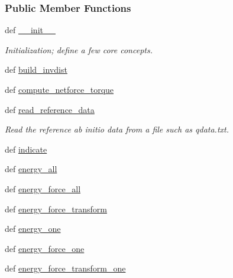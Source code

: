 \subsubsection*{Public Member Functions}
\begin{DoxyCompactItemize}
\item 
def \hyperlink{classforcebalance_1_1abinitio_1_1AbInitio_ad6d702694d6cd99e3432183e5c4860c9}{\-\_\-\-\_\-init\-\_\-\-\_\-}
\begin{DoxyCompactList}\small\item\em Initialization; define a few core concepts. \end{DoxyCompactList}\item 
def \hyperlink{classforcebalance_1_1abinitio_1_1AbInitio_a7475857193eefd4edd020d4f2a8fec17}{build\-\_\-invdist}
\item 
def \hyperlink{classforcebalance_1_1abinitio_1_1AbInitio_afbf86c26158a68cae7460b4106809fdd}{compute\-\_\-netforce\-\_\-torque}
\item 
def \hyperlink{classforcebalance_1_1abinitio_1_1AbInitio_aa73bedbf1e2cf19f2fa1e88815f1bd86}{read\-\_\-reference\-\_\-data}
\begin{DoxyCompactList}\small\item\em Read the reference ab initio data from a file such as qdata.\-txt. \end{DoxyCompactList}\item 
def \hyperlink{classforcebalance_1_1abinitio_1_1AbInitio_a3260db78e8c174f04a64661c4e5c181c}{indicate}
\item 
def \hyperlink{classforcebalance_1_1abinitio_1_1AbInitio_a99cca2d0bcbb382fcf7069907e74639f}{energy\-\_\-all}
\item 
def \hyperlink{classforcebalance_1_1abinitio_1_1AbInitio_acffb00d0edc291791eafb8a2d63ab3a1}{energy\-\_\-force\-\_\-all}
\item 
def \hyperlink{classforcebalance_1_1abinitio_1_1AbInitio_afdcc0b598565afa1b1456f78f87cc1be}{energy\-\_\-force\-\_\-transform}
\item 
def \hyperlink{classforcebalance_1_1abinitio_1_1AbInitio_aa91a79773331fdf845ab34e54ce99d47}{energy\-\_\-one}
\item 
def \hyperlink{classforcebalance_1_1abinitio_1_1AbInitio_a157be30ae6d556e17d8af30cefe393f4}{energy\-\_\-force\-\_\-one}
\item 
def \hyperlink{classforcebalance_1_1abinitio_1_1AbInitio_a961c909cf811a710095b091917c57d95}{energy\-\_\-force\-\_\-transform\-\_\-one}
\item 

\end{DoxyCompactItemize}
